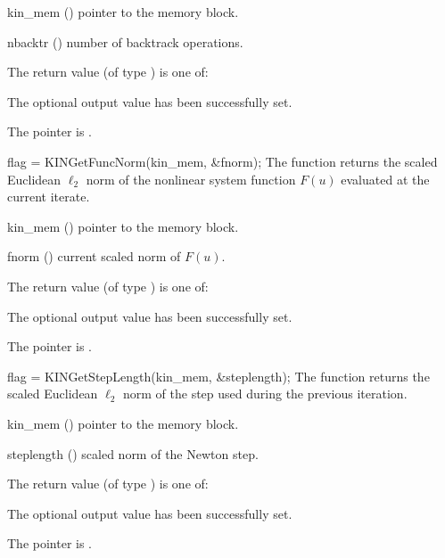 {
  \begin{args}
  \item[kin\_mem] ()
    pointer to the {\kinsol} memory block.
  \item[nbacktr] ()
    number of backtrack operations.
  \end{args}
}
{
  The return value  (of type ) is one of:
  \begin{args}
  \item[\Id{KIN\_SUCCESS}] 
    The optional output value has been successfully set.
  \item[\Id{KIN\_MEM\_NULL}]
    The  pointer is .
  \end{args}
}
{}
{
  flag = KINGetFuncNorm(kin\_mem, \&fnorm);
}
{
  The function  returns the scaled Euclidean $\ell_2$ norm of the 
  nonlinear system function $F(u)$ evaluated at the current iterate.
}
{
  \begin{args}
  \item[kin\_mem] ()
    pointer to the {\kinsol} memory block.
  \item[fnorm] ()
    current scaled norm of $F(u)$.
  \end{args}
}
{
  The return value  (of type ) is one of:
  \begin{args}
  \item[\Id{KIN\_SUCCESS}] 
    The optional output value has been successfully set.
  \item[\Id{KIN\_MEM\_NULL}]
    The  pointer is .
  \end{args}
}
{}
{
  flag = KINGetStepLength(kin\_mem, \&steplength);
}
{
  The function  returns the scaled Euclidean $\ell_2$ norm of
  the step used during the previous iteration.
}
{
  \begin{args}[steplength]
  \item[kin\_mem] ()
    pointer to the {\kinsol} memory block.
  \item[steplength] ()
    scaled norm of the Newton step.
  \end{args}
}
{
  The return value  (of type ) is one of:
  \begin{args}
  \item[\Id{KIN\_SUCCESS}] 
    The optional output value has been successfully set.
  \item[\Id{KIN\_MEM\_NULL}]
    The  pointer is .
  \end{args}
}
{}

